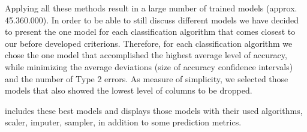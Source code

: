 Applying all these methods result in a large number of trained models (approx. 45.360.000). In order to be able to still discuss different models we have decided to present the one model for each classification algorithm that comes closest to our before developed criterions. Therefore, for each classification algorithm we chose the one model that accomplished the highest average level of accuracy, while minimizing the average deviations (size of accuracy confidence intervals) and the number of Type 2 errors. As measure of simplicity, we selected those models that also showed the lowest level of columns to be dropped. 

 includes these best models and displays those models with their used algorithms, scaler, imputer, sampler, in addition to some prediction metrics.  



